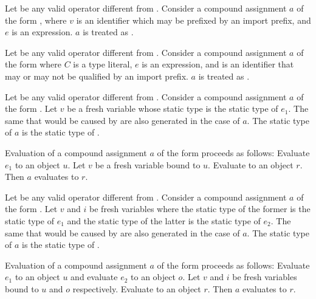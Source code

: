 \documentclass[makeidx]{article}
\begin{document}
\LMHash{}%
Let \op{} be any valid operator different from .
Consider a compound assignment $a$ of the form ,
where $v$ is an identifier which may be prefixed by an import prefix,
and $e$ is an expression.
$a$ is treated as .
\EndCase

\LMHash{}%
Let \op{} be any valid operator different from .
Consider a compound assignment $a$
of the form 
where $C$ is a type literal, $e$ is an expression, and
\id{} is an identifier that may or may not be qualified by an import prefix.
$a$ is treated as .
\EndCase

\LMHash{}%
Let \op{} be any valid operator different from .
Consider a compound assignment $a$
of the form .
Let $v$ be a fresh variable whose static type is the static type of $e_1$.
The same  that would be caused by
are also generated in the case of $a$.
The static type of $a$ is the static type of
.

\LMHash{}%
Evaluation of a compound assignment $a$
of the form 
proceeds as follows:
Evaluate $e_1$ to an object $u$.
Let $v$ be a fresh variable bound to $u$.
Evaluate  to an object $r$.
Then $a$ evaluates to $r$.
\EndCase

\LMHash{}%
Let \op{} be any valid operator different from .
Consider a compound assignment $a$
of the form .
Let $v$ and $i$ be fresh variables
where the static type of the former is the static type of $e_1$
and the static type of the latter is the static type of $e_2$.
The same  that would be caused by
are also generated in the case of $a$.
The static type of $a$ is the static type of
.

\LMHash{}%
Evaluation of a compound assignment $a$ of the form
proceeds as follows:
Evaluate $e_1$ to an object $u$ and evaluate $e_2$ to an object $o$.
Let $v$ and $i$ be fresh variables bound to $u$ and $o$ respectively.
Evaluate  to an object $r$.
Then $a$ evaluates to $r$.
\EndCase
\end{document}
